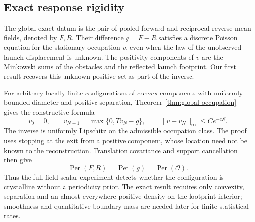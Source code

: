\subsection{Exact response rigidity}
The global exact datum is the pair of pooled forward and reciprocal
reverse mean fields, denoted by $F,R$. Their difference $g=F-R$
satisfies a discrete Poisson equation for the stationary occupation
$v$, even when the law of the unobserved launch displacement is unknown.
The positivity components of $v$ are the Minkowski sums of the
obstacles and the reflected launch footprint. Our first result
recovers this unknown positive set as part of the inverse.

For arbitrary locally finite configurations of convex components with
uniformly bounded diameter and positive separation,
Theorem~\ref{thm:global-occupation} gives the constructive formula
\[
 v_0=0,\qquad v_{N+1}=\max\{0,Tv_N-g\},\qquad
                    \|v-v_N\|_\infty\le C e^{-cN}.
\]
The inverse is uniformly Lipschitz on the admissible occupation
class. The proof uses stopping at the exit from a positive component,
whose location need not be known to the reconstruction. Translation
covariance and support cancellation then give
\begin{equation}\label{eq:intro-global-periods}
 \operatorname{Per}(F,R)=\operatorname{Per}(g)
                         =\operatorname{Per}(\mathcal O).
\end{equation}
Thus the full-field scalar experiment detects whether the configuration
is crystalline without a periodicity prior. The exact result requires
only convexity, separation and an almost everywhere positive density
on the footprint interior; smoothness and quantitative boundary mass
are needed later for finite statistical rates.

